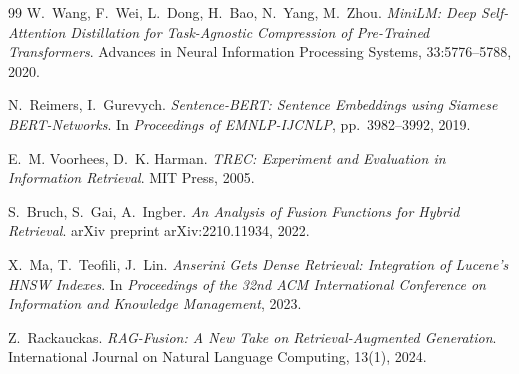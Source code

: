 \documentclass[runningheads,a4paper]{llncs}
\begin{document}
\begin{thebibliography}{99}
W.~Wang, F.~Wei, L.~Dong, H.~Bao, N.~Yang, M.~Zhou.
\newblock \textit{MiniLM: Deep Self-Attention Distillation for Task-Agnostic Compression of Pre-Trained Transformers}.
\newblock Advances in Neural Information Processing Systems, 33:5776--5788, 2020.

N.~Reimers, I.~Gurevych.
\newblock \textit{Sentence-BERT: Sentence Embeddings using Siamese BERT-Networks}.
\newblock In \textit{Proceedings of EMNLP-IJCNLP}, pp.~3982--3992, 2019.

E.~M. Voorhees, D.~K. Harman.
\newblock \textit{TREC: Experiment and Evaluation in Information Retrieval}.
\newblock MIT Press, 2005.

S.~Bruch, S.~Gai, A.~Ingber.
\newblock \textit{An Analysis of Fusion Functions for Hybrid Retrieval}.
\newblock arXiv preprint arXiv:2210.11934, 2022.

X.~Ma, T.~Teofili, J.~Lin.
\newblock \textit{Anserini Gets Dense Retrieval: Integration of Lucene's HNSW Indexes}.
\newblock In \textit{Proceedings of the 32nd ACM International Conference on Information and Knowledge Management}, 2023.

Z.~Rackauckas.
\newblock \textit{RAG-Fusion: A New Take on Retrieval-Augmented Generation}.
\newblock International Journal on Natural Language Computing, 13(1), 2024.

\end{thebibliography}

\clearpage

\end{document}

